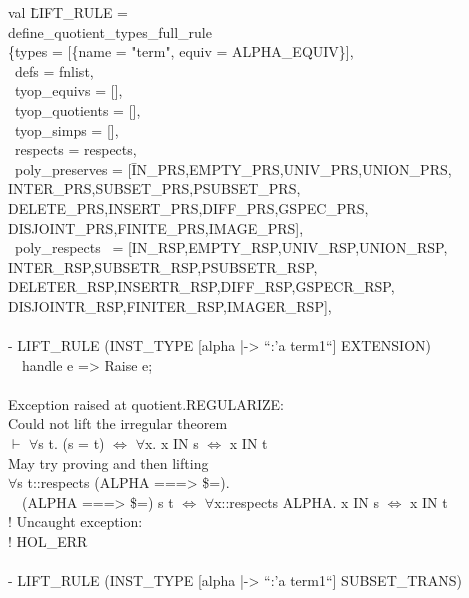 \documentclass[envcountsame,runningheads]{llncs}
\begin{document}
{\tt \begin{tabbing}
val \=LIFT\_RULE =  \\
\>  define\_quotient\_types\_full\_rule  \\
\>  \{types = [\{name = "term", equiv = ALPHA\_EQUIV\}],  \\
\>  \ defs = fnlist,  \\
\>  \ tyop\_equivs = [],  \\
\>  \ tyop\_quotients = [],  \\
\>  \ tyop\_simps = [],  \\
\>  \ respects = respects,  \\
\>  \ poly\_preserves = [\=IN\_PRS,EMPTY\_PRS,UNIV\_PRS,UNION\_PRS,  \\
\>\>                   INTER\_PRS,SUBSET\_PRS,PSUBSET\_PRS,  \\
\>\>                   DELETE\_PRS,INSERT\_PRS,DIFF\_PRS,GSPEC\_PRS,  \\
\>\>                   DISJOINT\_PRS,FINITE\_PRS,IMAGE\_PRS],  \\
\>  \ poly\_respects \ = [IN\_RSP,EMPTY\_RSP,UNIV\_RSP,UNION\_RSP,  \\
\>\>                   INTER\_RSP,SUBSETR\_RSP,PSUBSETR\_RSP,  \\
\>\>                   DELETER\_RSP,INSERTR\_RSP,DIFF\_RSP,GSPECR\_RSP,  \\
\>\>                   DISJOINTR\_RSP,FINITER\_RSP,IMAGER\_RSP],  \\
  \\
- LIFT\_RULE (INST\_TYPE [alpha |-> ``:'a term1``] EXTENSION)  \\
\ \ handle e => Raise e;  \\
  \\
Exception raised at quotient.REGULARIZE:  \\
Could not lift the irregular theorem  \\
$\vdash$ $\forall$s t. (s = t) $\Leftrightarrow$ $\forall$x. x IN s $\Leftrightarrow$ x IN t  \\
May try proving and then lifting  \\
$\forall$s t::respects (ALPHA ===> \$=).  \\
\ \ (ALPHA ===> \$=) s t $\Leftrightarrow$ $\forall$x::respects ALPHA. x IN s $\Leftrightarrow$ x IN t  \\
! Uncaught exception:   \\
! HOL\_ERR  \\
  \\
- LIFT\_RULE (INST\_TYPE [alpha |-> ``:'a term1``] SUBSET\_TRANS)  \\

\end{tabbing}}
\end{document}
